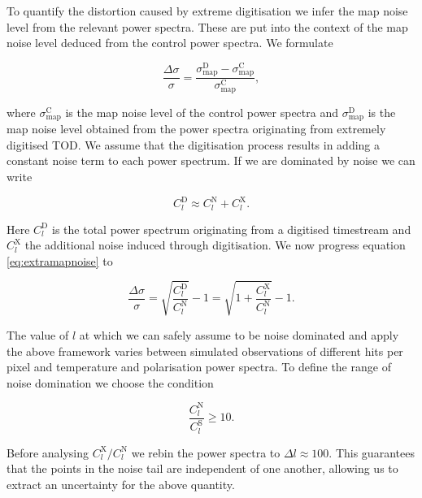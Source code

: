\documentclass[apj]{emulateapj}
\begin{document}
To quantify the distortion caused by extreme digitisation we infer the map noise level from the relevant power spectra. These are put into the context of the map noise level deduced from the control power spectra. We formulate

\begin{equation} \label{eq:extramapnoise}
\frac{\Delta \sigma}{\sigma} = \frac{\sigma_{\mathrm{map}}^{\mathrm{D}}-\sigma_{\mathrm{map}}^{\mathrm{C}}}{\sigma_{\mathrm{map}}^{\mathrm{C}}},
\end{equation}

where $\sigma_{\mathrm{map}}^{\mathrm{C}}$ is the map noise level of the control power spectra and $\sigma_{\mathrm{map}}^{\mathrm{D}}$ is the map noise level obtained from the power spectra originating from extremely digitised TOD. We assume that the digitisation process results in adding a constant noise term to each power spectrum. If we are dominated by noise we can write

\begin{equation} C_l^\mathrm{D} \approx C_l^\mathrm{N} + C_l^\mathrm{X}. \end{equation}

Here $C_l^\mathrm{D}$ is the total power spectrum originating from a digitised timestream and $C_l^\mathrm{X}$ the additional noise induced through digitisation. We now progress equation \ref{eq:extramapnoise} to

\begin{equation}\frac{\Delta \sigma}{\sigma} = \sqrt{\frac{C_l^\mathrm{D}}{C_l^{\mathrm{N}}}} - 1 = \sqrt{1 + \frac{C_l^\mathrm{X}}{C_l^{\mathrm{N}}}} - 1 . \end{equation}


The value of $l$ at which we can safely assume to be noise dominated and apply the above framework varies between simulated observations of different hits per pixel and temperature and polarisation power spectra. To define the range of noise domination we choose the condition

\begin{equation} \frac{C_l^{\mathrm{N}}}{C_l^{\mathrm{S}}} \geq 10. \end{equation}

Before analysing $C_l^\mathrm{X}/C_l^\mathrm{N}$ we rebin the power spectra to $\Delta l \approx 100$. This guarantees that the points in the noise tail are independent of one another, allowing us to extract an uncertainty for the above quantity.%
\end{document}
